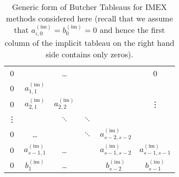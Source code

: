 \documentclass[11pt]{article}
\newcommand{\impl}{{(\text{im})}}
\begin{document}
\begin{table}
\begin{minipage}{0.45\linewidth}
\begin{center}
\begin{tabular}{|cccccc}
                0      &                   & \dots           &          &                     & 0                   \\
                0      & $a_{1,1}^\impl$                                                                            \\
                0      & $a_{2,1}^\impl$   & $a_{2,2}^\impl$ &          &                     & \vdots              \\
                \vdots &                   & $\ddots$        & $\ddots$                                             \\
                0      & \dots             &                 & $\ddots$ & $a_{s-2,s-2}^\impl$                       \\
                0      & $a_{s-1,1}^\impl$ & \dots           &          & $a_{s-1,s-2}^\impl$ & $a_{s-1,s-1}^\impl$ \\
                \hline
                0      & $b_1^\impl$       & \dots           &          & $b_{s-2}^\impl$     & $b_{s-1}^\impl$
            \end{tabular}
        \end{center}
    \end{minipage}
    \caption{Generic form of Butcher Tableaus for IMEX methods considered here (recall that we assume that $a_{i,0}^\impl = b_0^\impl=0$ and hence the first column of the implicit tableau on the right hand side contains only zeros).}
    \label{tab:butcher_tableaus}
\end{table}
\end{document}
